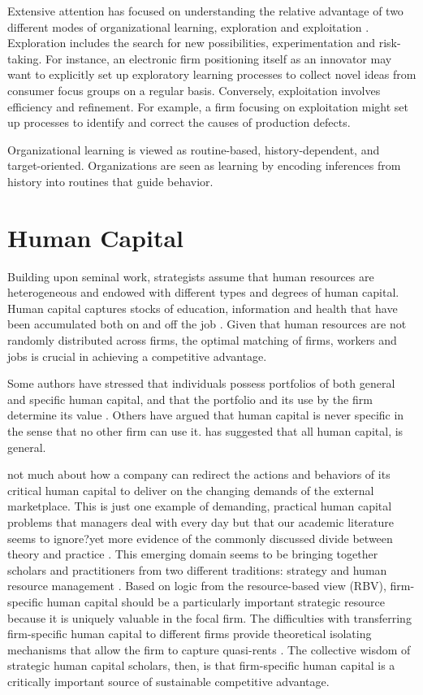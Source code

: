\documentclass[12pt,letterpaper]{article}
\begin{document}
Extensive attention has focused on understanding the relative advantage of two different modes of organizational learning, exploration and exploitation \cite{March1991a}. Exploration includes the search for new possibilities, experimentation and risk-taking. For instance, an electronic firm positioning itself as an innovator may want to explicitly set up exploratory learning processes to collect novel ideas from consumer focus groups on a regular basis. Conversely, exploitation involves efficiency and refinement. For example, a firm focusing on exploitation might set up processes to identify and correct the causes of production defects.

Organizational learning is viewed as routine-based, history-dependent, and target-oriented. Organizations are seen as learning by encoding inferences from history into routines that guide behavior.

\section{Human Capital}
Building upon \cite{Becker1962} seminal work, strategists assume that human resources are heterogeneous and endowed with different types and degrees of human capital. Human capital captures stocks of education, information and health that have been accumulated both on and off the job \citep{Becker1962}. Given that human resources are not randomly distributed across firms, the optimal
matching of firms, workers and jobs is crucial in achieving a competitive advantage.

Some authors have stressed that individuals possess portfolios of both general and specific human capital, and that the portfolio and its use by the firm determine its value \citep{Campbell2012}. Others have argued that human capital is never specific in the sense that no other firm can use it. \cite{Lazear2009} has suggested that all human capital, is general.



not much about how a company can redirect the actions and behaviors of its critical human capital to deliver on the changing demands of the external marketplace. This is just one example of demanding, practical human capital problems that managers deal with every day but that our academic literature seems to ignore?yet more evidence of the commonly discussed divide between theory and practice \citep{Bartunek2014}. This emerging domain seems to be bringing together scholars and practitioners from two different traditions: strategy and human resource management \citep{Wright2014}. Based on logic from the resource-based view
(RBV), firm-specific human capital should be a particularly important strategic resource because it is uniquely valuable in the focal firm. The difficulties with transferring firm-specific human capital to different firms provide theoretical isolating mechanisms that allow the firm to capture quasi-rents \citep{Barney1991, Campbell2012}. The collective wisdom of strategic human capital
scholars, then, is that firm-specific human capital is a critically important source of sustainable competitive advantage.
\end{document}
